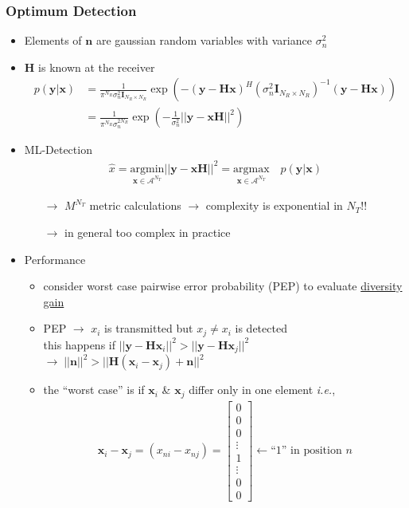 \documentclass[a4paper, 10pt]{article}
\begin{document}
\subsubsection{Optimum Detection}
\begin{itemize}
	\item Elements of $\mathbf{n}$ are gaussian random variables with variance $\sigma_n^2$
	\item $\mathbf{H}$ is known at the receiver
	\begin{align*}
		p(\mathbf{y}|\mathbf{x})&=\frac{1}{\pi^{N_R}\sigma_n^2\mathbf{I}_{N_R \times N_R}} \exp \left(-(\mathbf{y}-\mathbf{Hx})^H(\sigma_n^2\mathbf{I}_{N_R \times N_R})^{-1}(\mathbf{y}-\mathbf{Hx})\right)\\
		&=\frac{1}{\pi^{N_R}\sigma_n^{2N_R}}\exp\left(-\frac{1}{\sigma_n^2}||\mathbf{y}-\mathbf{xH}||^2\right)
	\end{align*}
	\item ML-Detection
	\begin{align*}
		\hat{x}=\underset{\mathbf{x}\in \mathscr{A}^{N_T}}{\mathrm{argmin}}||\mathbf{y}-\mathbf{xH}||^2=\underset{\mathbf{x}\in \mathscr{A}^{N_T}}{\mathrm{argmax}}\quad p(\mathbf{y}|\mathbf{x})
	\end{align*}
	\begin{itemize}
		\item[$\rightarrow$] $M^{N_T}$ metric calculations $\rightarrow$ complexity is exponential in $N_T$!!
		\item[$\rightarrow$] in general too complex in practice
	\end{itemize}
	\item Performance 
	\begin{itemize}
		\item consider worst case pairwise error probability (PEP) to evaluate \underline{diversity gain}
		\item PEP $\rightarrow$ $x_i$ is transmitted but $x_j\neq x_i$ is detected\\
		this happens if $||\mathbf{y}-\mathbf{Hx}_i||^2 > ||\mathbf{y}-\mathbf{Hx}_j||^2$\\
		$\rightarrow\; ||\mathbf{n}||^2>||\mathbf{H}(\mathbf{x}_i-\mathbf{x}_j)+\mathbf{n}||^2$
		\item the ``worst case'' is if $\mathbf{x}_i$ \& $\mathbf{x}_j$ differ only in one element \textit{i.e.},
		\begin{align*}
			 \mathbf{x}_i-\mathbf{x}_j=(x_{ni}-x_{nj})= \begin{bmatrix*} 0 \\ 0 \\ 0 \\ \vdots \\  1 \\ \vdots \\ 0 \\ 0  \end{bmatrix*}\leftarrow \text{``1'' in position } n

\end{align*}
\end{itemize}
\end{itemize}
\end{document}

